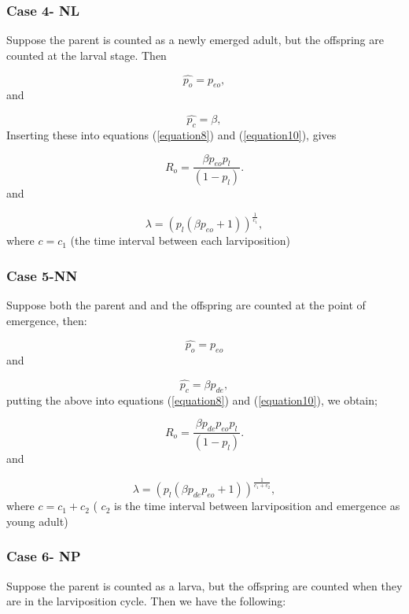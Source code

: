 \documentclass[10pt,a4paper]{article}
\begin{document}
\subsubsection*{Case 4- NL}

Suppose the parent is counted as a newly emerged adult, but the offspring are counted at the larval stage. Then

$$\hat{p_o}= p_{eo},$$ and 

$$\hat{p_c}= \beta,$$
Inserting these into  equations (\ref{equation8}) and (\ref{equation10}), gives

\begin{equation}
\label{equation88} 
R_o =\frac{\beta p_{eo}p_l}{(1-p_l)}.
\end{equation} and

\begin{equation}
\label{equation102} 
\lambda =(p_l(\beta p_{eo}+1))^\frac{1}{c_1},
\end{equation}
where $c = c_1$ (the time interval between each larviposition) 


  
\subsubsection*{Case 5-NN}

Suppose both the parent and and the offspring are counted at the point of emergence, then:

$$\hat{p_o}= p_{eo} $$ and 

$$\hat{p_c}= \beta p_{de},$$ putting the above into equations (\ref{equation8}) and (\ref{equation10}), we obtain;

\begin{equation}
 \label{equation8884} 
R_o =\frac{\beta p_{de}p_{eo}p_l}{(1-p_l)}.
 \end{equation} and 


\begin{equation}
\label{equation104} 
\lambda =(p_l(\beta p_{de}p_{eo}+1))^\frac{1}{c_1 + c_2},
\end{equation}
where $c = c_1 + c_2$ ( $c_2$ is the time interval between larviposition and emergence as young adult)  
 
\subsubsection*{Case 6- NP}

Suppose the parent is counted as a larva, but the offspring are counted when they are in the larviposition cycle. Then we have the following:
\end{document}
